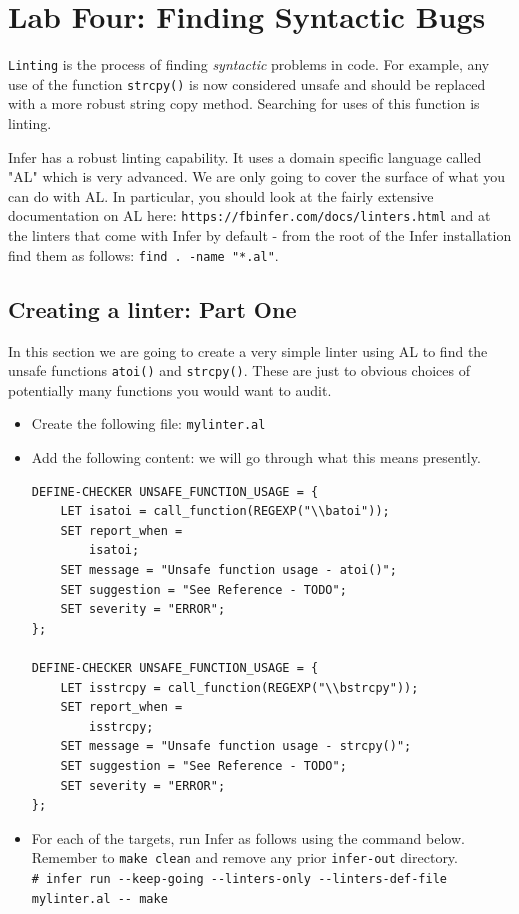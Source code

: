 \section{Lab Four: Finding Syntactic Bugs}

\texttt{Linting} is the process of finding \textit{syntactic} problems in code.
For example, any use of the function \verb|strcpy()| is now considered unsafe
and should be replaced with a more robust string copy method. 
Searching for uses of this function is linting.

Infer has a robust linting capability. It uses a domain specific language
called "AL" which is very advanced. We are only going to cover the surface 
of what you can do with AL. In particular, you should look at the fairly
extensive documentation on AL here: \verb|https://fbinfer.com/docs/linters.html|
and at the linters that come with Infer by default - from the root of the Infer installation  
find them as follows:  \verb|find . -name "*.al"|.

\subsection{Creating a linter: Part One}

In this section we are going to create a very simple linter using AL 
to find the unsafe functions \verb|atoi()| and \verb|strcpy()|. 
These are just to obvious choices of potentially many functions you would want to audit.

\begin{itemize}
	\item Create the following file: \verb|mylinter.al|
	\item Add the following content: we will go through what this means presently.
	\begin{verbatim}
DEFINE-CHECKER UNSAFE_FUNCTION_USAGE = {
	LET isatoi = call_function(REGEXP("\\batoi"));
	SET report_when =
		isatoi;
	SET message = "Unsafe function usage - atoi()";
	SET suggestion = "See Reference - TODO";
	SET severity = "ERROR";
};

DEFINE-CHECKER UNSAFE_FUNCTION_USAGE = {
	LET isstrcpy = call_function(REGEXP("\\bstrcpy"));
	SET report_when =
		isstrcpy;
	SET message = "Unsafe function usage - strcpy()";
	SET suggestion = "See Reference - TODO";
	SET severity = "ERROR";
};
	\end{verbatim}
	\item For each of the targets, run Infer as follows using the command below.\\
	Remember to \verb|make clean| and remove any prior \verb|infer-out| directory.\\
	\verb|# infer run --keep-going --linters-only --linters-def-file mylinter.al -- make|
\end{itemize}

